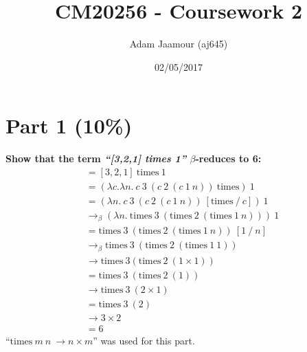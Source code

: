 \documentclass{article}
\title{CM20256 - Coursework 2}
\date{02/05/2017}
\author{Adam Jaamour (aj645)}
\begin{document}

	\newcommand{\lamb}{$\lambda$}
	\newcommand{\la}{\lambda}
	\newcommand{\be}{$\beta$}
	
	\newcommand{\sa}{\quad}
	
	\newcommand{\equals}{\rightarrow_\beta}
	\newcommand{\equalsT}{\sa \rightarrow_\beta^*\sa}
	
	\newcommand{\tim}{\text{times}}
	
	\maketitle
	\newpage
	
	\tableofcontents
	\newpage
	
	
	
	\section{Part 1 (10\%)}

	\begin{Large}
		\textbf{Show that the term \textit{``[3,2,1] times 1''} $\beta$-reduces to 6:}
		\begin{align*}
			&= [3,2,1] \ \tim \ 1 \\
			&= (\la c. \la n . \ c \ 3 \ (c \ 2 \ (c \ 1 \ n)) \ \tim ) \ 1 \\
			&= (\la n . \ c \ 3 \ (c \ 2 \ (c \ 1 \ n)) \ [\tim \ / \ c ]) \ 1 \\
			&\equals (\la n . \ \tim \ 3 \ (\tim \ 2 \ (\tim \ 1 \ n))) \ 1 \\
			&= \tim \ 3 \ (\tim \ 2 \ (\tim \ 1 \ n)) \ [1 \ / \ n] \\
			&\equals \tim \ 3 \ (\tim \ 2 \ (\tim \ 1 \ 1)) \\
			&\rightarrow \tim \ 3(\tim \ 2 \ (1 \times 1)) \\
			&= \tim \ 3 \ (\tim \ 2 \ (1)) \\
			&\rightarrow \tim \ 3 \ (2 \times 1) \\
			&= \tim \ 3 \ (2) \\
			&\rightarrow 3 \times 2 \\
			&= 6
		\end{align*}
		``$\tim \ m \ n \ \rightarrow n \times m$'' was used for this part.
	\end{Large}
	\newpage
	
\end{document}
